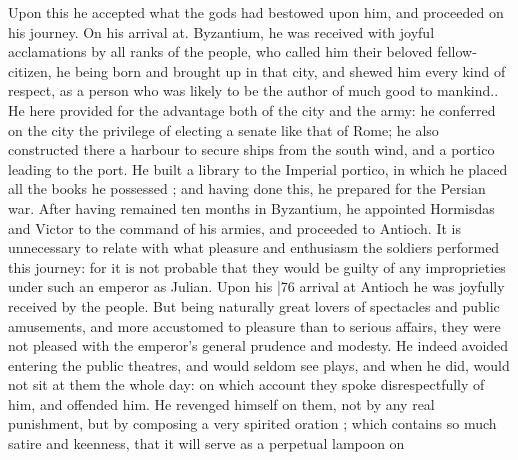Upon this he accepted what the gods had bestowed upon him, and proceeded on his journey. On his arrival at. Byzantium, he was received with joyful acclamations by all ranks of the people, who called him their beloved fellow-citizen, he being born and brought up in that city, and shewed him every kind of respect, as a person who was likely to be the author of much good to mankind.. He here provided for the advantage both of the city and the army: he conferred on the city the privilege of electing a senate like that of Rome; he also constructed there a harbour to secure ships from the south wind, and a portico leading to the port. He built a library to the Imperial portico, in which he placed all the books he possessed ; and having done this, he prepared for the Persian war. After having remained ten months in Byzantium, he appointed Hormisdas and Victor to the command of his armies, and proceeded to Antioch. It is unnecessary to relate with what pleasure and enthusiasm the soldiers performed this journey: for it is not probable that they would be guilty of any improprieties under such an emperor as Julian. Upon his
|76 arrival at Antioch he was joyfully received by the people. But being naturally great lovers of spectacles and public amusements, and more accustomed to pleasure than to serious affairs, they were not pleased with the emperor's general prudence and modesty. He indeed avoided entering the public theatres, and would seldom see plays, and when he did, would not sit at them the whole day: on which account they spoke disrespectfully of him, and offended him. He revenged himself on them, not by any real punishment, but by composing a very spirited oration ; which contains so much satire and keenness, that it will serve as a perpetual lampoon on
